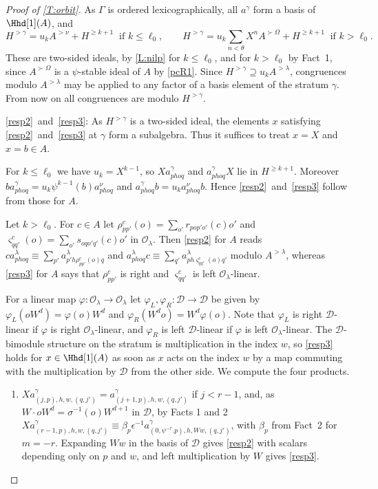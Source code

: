 \documentclass[a4paper,11pt]{amsart}
\numberwithin{equation}{subsection}
\theoremstyle{definition}
\theoremstyle{theorem}
\theoremstyle{remark}
\newcommand\CO{\mathcal{O}}
\newcommand\Olam[1][\lambda]{\CO_{#1}}
\begin{document}
\begin{proof}[Proof of \autoref{T:orbit}]
\noindent As $\Gamma$ is ordered lexicographically, all $a^{\gamma}$ form a basis of
$\Hhd[1](A)$, and
\[
  H^{>\gamma}=u_kA^{>\nu}+H^{\ge k+1}\ \text{ if }k\le\ell_0,
  \qquad
  H^{>\gamma}=u_k\sum_{n<\theta}X^{n}A^{\succ\Omega}+H^{\ge k+1}\ \text{ if }k>\ell_0 .
\]
These are two-sided ideals, by \autoref{L:nilp} for $k\le\ell_0$, and for $k>\ell_0$ by
Fact~1, since $A^{\succ\Omega}$ is a $\psi$-stable ideal of $A$ by \autoref{pcR1}. Since
$H^{>\gamma}\supseteq u_kA^{>\lambda}$, congruences modulo $A^{>\lambda}$ may be applied to any
factor of a basis element of the stratum $\gamma$. From now on all congruences are modulo
$H^{>\gamma}$.

\noindent \autoref{resp2}~and~\autoref{resp3}: As $H^{>\gamma}$ is a two-sided ideal, the elements
$x$ satisfying \autoref{resp2}~and~\autoref{resp3} at $\gamma$ form a subalgebra. Thus it suffices to treat $x=X$ and $x=b\in A$.

\noindent For $k\le\ell_0$ we have $u_k=X^{k-1}$, so $Xa^{\gamma}_{phoq}$ and
$a^{\gamma}_{phoq}X$ lie in $H^{\ge k+1}$. Moreover
$ba^{\gamma}_{phoq}=u_k\psi^{k-1}(b)a^{\nu}_{phoq}$ and $a^{\gamma}_{phoq}b=u_ka^{\nu}_{phoq}b$. Hence \autoref{resp2}~and~\autoref{resp3} follow from those for $A$.

\noindent Let $k>\ell_0$. For $c\in A$ let $\rho^{c}_{pp'}(o)=\sum_{o'}r_{pop'o'}(c)o'$ and
$\varsigma^{c}_{qq'}(o)=\sum_{o'}s_{oqo'q'}(c)o'$ in $\Olam$. Then \autoref{resp2} for $A$
reads $ca^{\lambda}_{phoq}\equiv\sum_{p'}a^{\lambda}_{p'h\rho^{c}_{pp'}(o)q}$ and
$a^{\lambda}_{phoq}c\equiv\sum_{q'}a^{\lambda}_{ph\varsigma^{c}_{qq'}(o)q'}$ modulo
$A^{>\lambda}$, whereas \autoref{resp3} for $A$ says that $\rho^{c}_{pp'}$ is right and
$\varsigma^{c}_{qq'}$ is left $\Olam$-linear.

For a linear map $\varphi\colon\Olam\to\Olam$
let $\varphi_L,\varphi_R\colon\mathcal D\to\mathcal D$ be given by $\varphi_L(oW^{d})=\varphi(o)W^{d}$
and $\varphi_R(W^{d}o)=W^{d}\varphi(o)$. Note that
$\varphi_L$ is right $\mathcal D$-linear if $\varphi$ is right $\Olam$-linear, and $\varphi_R$
is left $\mathcal D$-linear if $\varphi$ is left $\Olam$-linear. The $\mathcal D$-bimodule
structure on the stratum is multiplication in the index $w$, so
\autoref{resp3} holds for $x\in\Hhd[1](A)$ as soon as $x$ acts on the index $w$ by a map commuting with the
multiplication by $\mathcal D$ from the other side. We compute the four products.
\begin{enumerate}[label=(\roman*),wide,labelindent=0pt]
\item $Xa^{\gamma}_{(j,p),h,w,(q,j')}=a^{\gamma}_{(j+1,p),h,w,(q,j')}$ if $j<r-1$, and, as
  $W\cdot oW^{d}=\sigma^{-1}(o)W^{d+1}$ in $\mathcal D$, by Facts 1 and 2
  $Xa^{\gamma}_{(r-1,p),h,w,(q,j')}\equiv\beta_p\epsilon^{-1}a^{\gamma}_{(0,\psi^{-r}.p),h,Ww,(q,j')}$,
  with $\beta_p$ from Fact~2 for $m=-r$. Expanding $Ww$ in the basis of $\mathcal D$ gives
  \autoref{resp2} with scalars depending only on $p$ and $w$, and left multiplication by $W$
  gives \autoref{resp3}.


\end{enumerate}
\end{proof}
\end{document}

